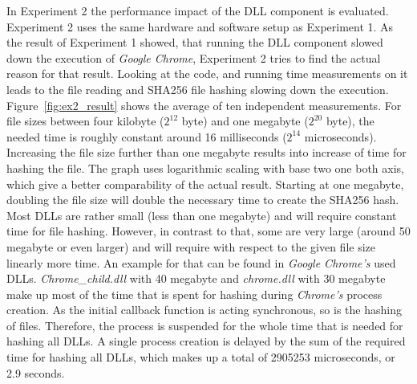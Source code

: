 In Experiment 2 the performance impact of the \gls{DLL} component is evaluated. Experiment 2 uses the same hardware and software setup as Experiment 1. As the result of Experiment 1 showed, that running the \gls{DLL} component slowed down the execution of \emph{Google Chrome}, Experiment 2 tries to find the actual reason for that result. Looking at the code, and running time measurements on it leads to the file reading and SHA256 file hashing slowing down the execution. Figure~\ref{fig:ex2_result} shows the average of ten independent measurements. For file sizes between four kilobyte ($2^{12}$ byte) and one megabyte ($2^{20}$ byte), the needed time is roughly constant around 16 milliseconds ($2^{14}$ microseconds). Increasing the file size further than one megabyte results into increase of time for hashing the file. The graph uses logarithmic scaling with base two one both axis, which give a better comparability of the actual result. Starting at one megabyte, doubling the file size will double the necessary time to create the SHA256 hash. Most \glspl{DLL} are rather small (less than one megabyte) and will require constant time for file hashing. However, in contrast to that, some are very large (around 50 megabyte or even larger) and will require with respect to the given file size linearly more time. An example for that can be found in \emph{Google Chrome's} used \glspl{DLL}. \emph{Chrome\_child.dll} with 40 megabyte and \emph{chrome.dll} with 30 megabyte make up most of the time that is spent for hashing during \emph{Chrome's} process creation. As the initial callback function  is acting synchronous, so is the hashing of files. Therefore, the process is suspended for the whole time that is needed for hashing all \glspl{DLL}. A single process creation is delayed by the sum of the required time for hashing all \glspl{DLL}, which makes up a total of 2905253 microseconds, or 2.9 seconds.

